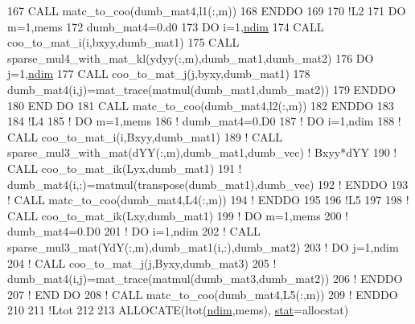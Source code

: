 \begin{DoxyCode}
167        \textcolor{keyword}{CALL }matc\_to\_coo(dumb\_mat4,l1(:,m))
168 \textcolor{keywordflow}{    ENDDO}
169 
170     \textcolor{comment}{!L2}
171     \textcolor{keywordflow}{DO} m=1,mems
172        dumb\_mat4=0.d0
173        \textcolor{keywordflow}{DO} i=1,\hyperlink{namespaceparams_a2323fe1773f086e20c14f266351c482b}{ndim}
174           \textcolor{keyword}{CALL }coo\_to\_mat\_i(i,bxyy,dumb\_mat1)
175           \textcolor{keyword}{CALL }sparse\_mul4\_with\_mat\_kl(ydyy(:,m),dumb\_mat1,dumb\_mat2)
176           \textcolor{keywordflow}{DO} j=1,\hyperlink{namespaceparams_a2323fe1773f086e20c14f266351c482b}{ndim}
177              \textcolor{keyword}{CALL }coo\_to\_mat\_j(j,byxy,dumb\_mat1)
178              dumb\_mat4(i,j)=mat\_trace(matmul(dumb\_mat1,dumb\_mat2))
179 \textcolor{keywordflow}{          ENDDO}
180 \textcolor{keywordflow}{       END DO}
181        \textcolor{keyword}{CALL }matc\_to\_coo(dumb\_mat4,l2(:,m))
182 \textcolor{keywordflow}{    ENDDO}
183 
184     \textcolor{comment}{!L4}
185     \textcolor{comment}{! DO m=1,mems}
186     \textcolor{comment}{!    dumb\_mat4=0.D0}
187     \textcolor{comment}{!    DO i=1,ndim}
188     \textcolor{comment}{!       CALL coo\_to\_mat\_i(i,Bxyy,dumb\_mat1)}
189     \textcolor{comment}{!       CALL sparse\_mul3\_with\_mat(dYY(:,m),dumb\_mat1,dumb\_vec) ! Bxyy*dYY}
190     \textcolor{comment}{!       CALL coo\_to\_mat\_ik(Lyx,dumb\_mat1)}
191     \textcolor{comment}{!       dumb\_mat4(i,:)=matmul(transpose(dumb\_mat1),dumb\_vec)}
192     \textcolor{comment}{!    ENDDO}
193     \textcolor{comment}{!    CALL matc\_to\_coo(dumb\_mat4,L4(:,m))           }
194     \textcolor{comment}{! ENDDO}
195 
196     \textcolor{comment}{!L5}
197     
198     \textcolor{comment}{! CALL coo\_to\_mat\_ik(Lxy,dumb\_mat1)}
199     \textcolor{comment}{! DO m=1,mems}
200     \textcolor{comment}{!    dumb\_mat4=0.D0}
201     \textcolor{comment}{!    DO i=1,ndim}
202     \textcolor{comment}{!       CALL sparse\_mul3\_mat(YdY(:,m),dumb\_mat1(i,:),dumb\_mat2)}
203     \textcolor{comment}{!       DO j=1,ndim}
204     \textcolor{comment}{!          CALL coo\_to\_mat\_j(j,Byxy,dumb\_mat3)}
205     \textcolor{comment}{!          dumb\_mat4(i,j)=mat\_trace(matmul(dumb\_mat3,dumb\_mat2))}
206     \textcolor{comment}{!       ENDDO}
207     \textcolor{comment}{!    END DO}
208     \textcolor{comment}{!    CALL matc\_to\_coo(dumb\_mat4,L5(:,m))}
209     \textcolor{comment}{! ENDDO}
210 
211     \textcolor{comment}{!Ltot}
212 
213     \textcolor{keyword}{ALLOCATE}(ltot(\hyperlink{namespaceparams_a2323fe1773f086e20c14f266351c482b}{ndim},mems), \hyperlink{namespacestat}{stat}=allocstat)

\end{DoxyCode}
